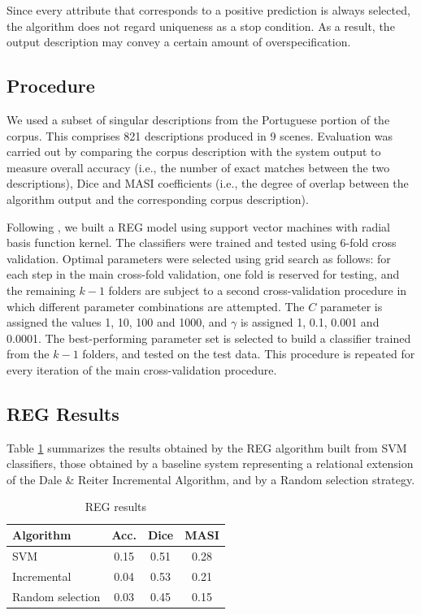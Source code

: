 \documentclass{article}
\begin{document}
Since every attribute that corresponds to a positive prediction is always selected, the algorithm does not regard uniqueness as a stop condition. As a result, the output description may convey a certain amount of overspecification.


\subsection{Procedure}

We used a subset of singular descriptions from the Portuguese portion of the corpus. This comprises  821 descriptions produced in 9 scenes. Evaluation was carried out by comparing the corpus description with the system output to measure overall accuracy (i.e., the number of exact matches between the two descriptions), Dice \cite{dice} and MASI \cite{masi} coefficients (i.e., the degree of overlap between the algorithm output and the corresponding corpus description).

Following \cite{thiago-svm}, we built a REG model using support vector machines with radial basis function kernel. The classifiers were trained and tested using 6-fold cross validation. Optimal parameters were selected using grid search as follows: for each step in the main cross-fold validation, one fold is reserved for testing, and the remaining $k-1$ folders are subject  to a second cross-validation procedure in which different parameter combinations are attempted. The $C$ parameter is assigned the values 1, 10, 100 and 1000, and $\gamma$ is assigned 1, 0.1, 0.001 and 0.0001. The best-performing parameter set is selected to build a classifier trained from the $k-1$ folders, and tested on the test data. This procedure is repeated for every iteration of the main cross-validation procedure.


\subsection{REG Results}

Table \ref{tab-reg-results} summarizes the results obtained by the REG algorithm built from SVM classifiers, those obtained by a baseline system representing a relational extension of the Dale \& Reiter Incremental Algorithm, and by a Random selection strategy.  


\begin{table}[ht]
\begin{center}
\caption{REG results}
\label{tab-reg-results}
\begin{tabular} {  l c c c }
\hline
{Algorithm}							& {Acc.} 	& { Dice}		& MASI \\ \hline 
SVM											& 0.15		&	0.51			& 0.28 \\
Incremental							& 0.04		&	0.53			& 0.21 \\
Random selection       	& 0.03    & 0.45      & 0.15 \\
\hline
\end{tabular}
\end{center}
\end{table}
\end{document}
